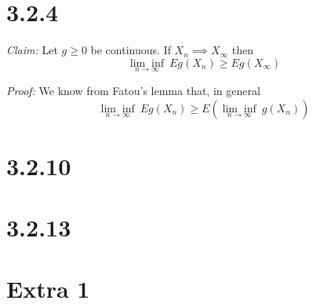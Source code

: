 \documentclass[10pt]{article}
\begin{document}
\section*{3.2.4}
\textit{Claim:}
Let $g \ge 0$ be continuous. If $X_n \implies X_\infty$ then
\begin{equation*}
  \underset{n \to \infty}{\lim \inf} \ E g(X_n) \ge E g(X_\infty)
\end{equation*}

\textit{Proof:}
We know from Fatou's lemma that, in general
\begin{equation*}
  \underset{n \to \infty}{\lim \inf} \ E g(X_n) 
  \ge E (\underset{n \to \infty}{\lim \inf} \ g(X_n)) 
\end{equation*}

\section*{3.2.10}

\section*{3.2.13}

\section*{Extra 1}
\end{document}
